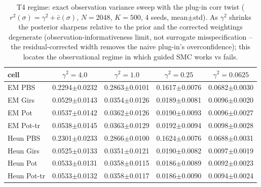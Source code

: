 \begin{table}[ht]
\centering
\caption{T4 regime: exact observation variance sweep with the plug-in corr twist ($r^2(\sigma)=\gamma^2+\bar c(\sigma)$, $N=2048$, $K=500$, 4 seeds, mean$\pm$std).  As $\gamma^2$ shrinks the posterior sharpens relative to the prior and the corrected weightings degenerate (observation-informativeness limit, not surrogate misspecification -- the residual-corrected width removes the naive plug-in's overconfidence); this locates the observational regime in which guided SMC works vs fails.}
\label{tab:toy_t4}
\begin{tabular}{lcccc}
\toprule
cell & $\gamma^2=4.0$ & $\gamma^2=1.0$ & $\gamma^2=0.25$ & $\gamma^2=0.0625$ \\
\midrule
EM PBS & 0.2294$\pm$0.0232 & 0.2863$\pm$0.0101 & 0.1617$\pm$0.0076 & 0.0682$\pm$0.0030 \\
EM Girs & 0.0529$\pm$0.0143 & 0.0354$\pm$0.0126 & 0.0189$\pm$0.0081 & 0.0096$\pm$0.0020 \\
EM Pot & 0.0537$\pm$0.0142 & 0.0362$\pm$0.0126 & 0.0190$\pm$0.0093 & 0.0096$\pm$0.0027 \\
EM Pot-tr & 0.0538$\pm$0.0145 & 0.0363$\pm$0.0129 & 0.0192$\pm$0.0094 & 0.0098$\pm$0.0028 \\
Heun PBS & 0.2301$\pm$0.0233 & 0.2866$\pm$0.0100 & 0.1624$\pm$0.0076 & 0.0688$\pm$0.0031 \\
Heun Girs & 0.0525$\pm$0.0133 & 0.0351$\pm$0.0121 & 0.0190$\pm$0.0082 & 0.0097$\pm$0.0019 \\
Heun Pot & 0.0533$\pm$0.0131 & 0.0358$\pm$0.0115 & 0.0186$\pm$0.0089 & 0.0092$\pm$0.0023 \\
Heun Pot-tr & 0.0533$\pm$0.0132 & 0.0358$\pm$0.0117 & 0.0186$\pm$0.0090 & 0.0094$\pm$0.0024 \\
\bottomrule
\end{tabular}
\end{table}
